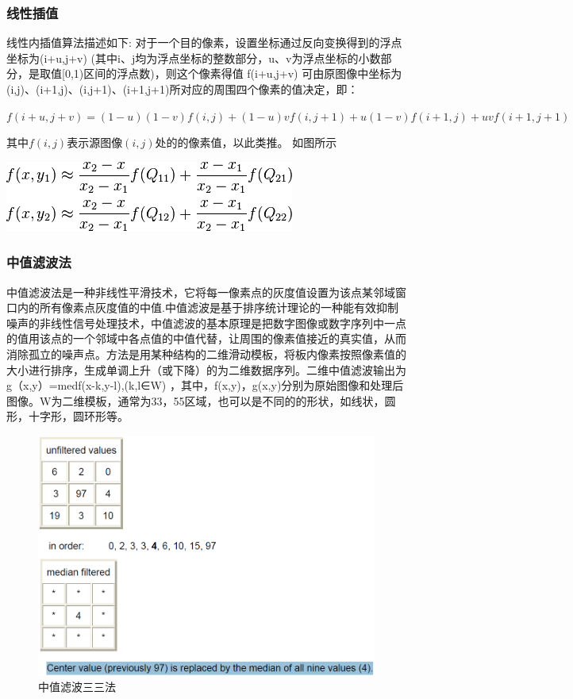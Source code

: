 \subsubsection{线性插值}
线性内插值算法描述如下:
对于一个目的像素，设置坐标通过反向变换得到的浮点坐标为(i+u,j+v) (其中i、j均为浮点坐标的整数部分，u、v为浮点坐标的小数部分，是取值[0,1)区间的浮点数)，则这个像素得值 f(i+u,j+v) 可由原图像中坐标为 (i,j)、(i+1,j)、(i,j+1)、(i+1,j+1)所对应的周围四个像素的值决定，即：

$f(i+u,j+v) = (1-u)(1-v)f(i,j) + (1-u)vf(i,j+1) + u(1-v)f(i+1,j) + uvf(i+1,j+1)$                          

其中$f(i,j)$表示源图像$(i,j)$处的的像素值，以此类推。
如图所示


\begin{center}
\includegraphics[width=0.7\linewidth]{Figure/figureline_1}
\end{center}


\subsubsection{中值滤波法}
中值滤波法是一种非线性平滑技术，它将每一像素点的灰度值设置为该点某邻域窗口内的所有像素点灰度值的中值.中值滤波是基于排序统计理论的一种能有效抑制噪声的非线性信号处理技术，中值滤波的基本原理是把数字图像或数字序列中一点的值用该点的一个邻域中各点值的中值代替，让周围的像素值接近的真实值，从而消除孤立的噪声点。方法是用某种结构的二维滑动模板，将板内像素按照像素值的大小进行排序，生成单调上升（或下降）的为二维数据序列。二维中值滤波输出为g（x,y）=med{f(x-k,y-l),(k,l∈W)} ，其中，f(x,y)，g(x,y)分别为原始图像和处理后图像。W为二维模板，通常为33，55区域，也可以是不同的的形状，如线状，圆形，十字形，圆环形等。
\begin{figure}[h]
\centering
\includegraphics[width=0.7\linewidth]{Figure/median_1}
\caption{中值滤波三三法}
\label{fig:median_1}
\end{figure}

